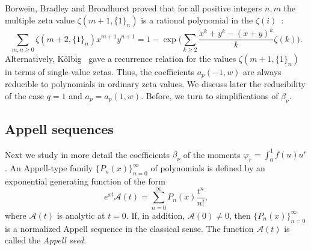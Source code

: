 \documentclass[10pt,reqno,a4paper]{amsart}%
\theoremstyle{definition}
\newcommand{\ap}{\ensuremath{\mathcal{A}}}%
\begin{document}
Borwein, Bradley and Broadhurst proved that for all positive integers $n,m$
the multiple zeta value $\zeta(m+1,\{1\}_{n})$ is a rational polynomial in the
$\zeta(i)$~\cite[Eq. (10)]{BBB}:
\begin{equation}
\sum_{m,n\geq0}\zeta(m+2,\{1\}_{n})x^{m+1}y^{n+1}=1-\exp\biggl(\sum_{k\geq
2}\frac{x^{k}+y^{k}-(x+y)^{k}}{k}\zeta(k)\biggr). \label{eqn:BBB}%
\end{equation}
Alternatively, K\"{o}lbig~\cite{Kolbig} gave a recurrence relation for the
values $\zeta(m+1,\{1\}_{n})$ in terms of single-value zetas.
Thus, the coefficients $a_{p}(-1,w)$ are always reducible to polynomials in
ordinary zeta values. We discuss later the reducibility of the case $q=1$ and
$a_{p}=a_{p}(1,w)$. Before, we turn to simplifications of $\beta_{\nu}$.

\subsection{Appell sequences}

Next we study in more detail the coefficients $\beta_{\nu}$ of the moments
$\varphi_{r}=\int_{0}^{1}f(u)u^{r}$. An Appell-type family $\{P_{n}%
(x)\}_{n=0}^{\infty}$ of polynomials is defined by an exponential generating
function of the form
\begin{equation}
e^{xt}\ap(t)=\sum_{n=0}^{\infty}P_{n}(x)\frac{t^{n}}{n!},
\end{equation}
where $\ap(t)$ is analytic at $t=0$. If, in addition, $\ap%
(0)\neq0$, then $\{P_{n}(x)\}_{n=0}^{\infty}$ is a normalized Appell sequence
in the classical sense. The function $\ap(t)$ is called the
\emph{Appell seed}.
\end{document}
